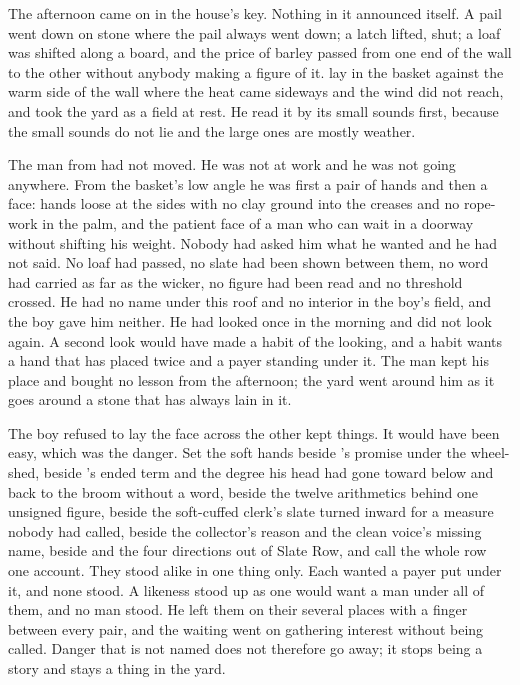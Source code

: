 The afternoon came on in the house's key. Nothing in it announced itself. A pail went down on stone where the pail always went down; a latch lifted, shut; a loaf was shifted along a board, and the price of barley passed from one end of the wall to the other without anybody making a figure of it.  lay in the basket against the warm side of the wall where the heat came sideways and the wind did not reach, and took the yard as a field at rest. He read it by its small sounds first, because the small sounds do not lie and the large ones are mostly weather.

The man from  had not moved. He was not at work and he was not going anywhere. From the basket's low angle he was first a pair of hands and then a face: hands loose at the sides with no clay ground into the creases and no rope-work in the palm, and the patient face of a man who can wait in a doorway without shifting his weight. Nobody had asked him what he wanted and he had not said. No loaf had passed, no slate had been shown between them, no word had carried as far as the wicker, no figure had been read and no threshold crossed. He had no name under this roof and no interior in the boy's field, and the boy gave him neither. He had looked once in the morning and did not look again. A second look would have made a habit of the looking, and a habit wants a hand that has placed twice and a payer standing under it. The man kept his place and bought no lesson from the afternoon; the yard went around him as it goes around a stone that has always lain in it.

The boy refused to lay the face across the other kept things. It would have been easy, which was the danger. Set the soft hands beside 's promise under the wheel-shed, beside 's ended term and the degree his head had gone toward  below  and back to the broom without a word, beside the twelve arithmetics behind one unsigned figure, beside the soft-cuffed clerk's slate turned inward for a measure nobody had called, beside the collector's reason and the clean voice's missing name, beside  and the four directions out of Slate Row, and call the whole row one account. They stood alike in one thing only. Each wanted a payer put under it, and none stood. A likeness stood up as one would want a man under all of them, and no man stood. He left them on their several places with a finger between every pair, and the waiting went on gathering interest without being called. Danger that is not named does not therefore go away; it stops being a story and stays a thing in the yard.

